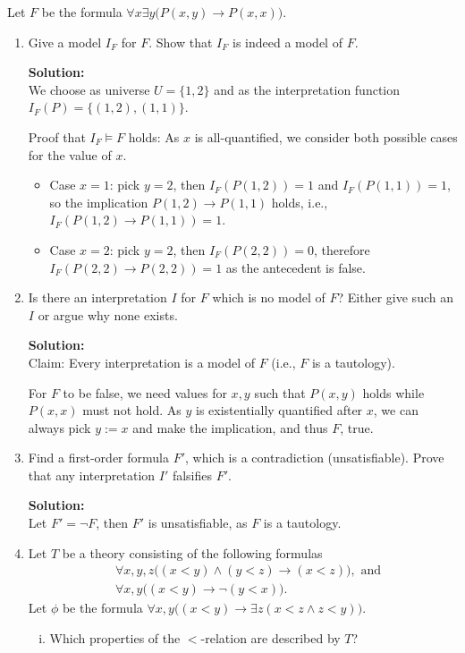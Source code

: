 \documentclass[11pt,a4paper]{uebung}
\newcommand{\solution}[1]{\par {\bf Solution:}\\#1}
\begin{document}
\newpage


Let $F$ be the formula $\forall x \exists y \big( P(x,y) \rightarrow P(x,x) \big)$.

\begin{enumerate}
\item Give a model $I_F$ for $F$. Show that $I_F$ is indeed a model of $F$.
\solution{

  We choose as universe $U = \{ 1,2 \}$ and as the interpretation function
  $I_F(P)=\{ (1,2), (1,1) \}$.

  Proof that $I_F \models F$ holds: 
  As $x$ is all-quantified, we consider both possible cases for the value of
  $x$.
  \begin{itemize}
  \item Case $x=1$: pick $y=2$, then $I_F(P(1,2))=1$ and $I_F(P(1,1))=1$, so
    the implication $P(1,2) \rightarrow P(1,1)$ holds, i.e., $I_F(P(1,2)
    \rightarrow P(1,1))=1$.
  \item Case $x=2$: pick $y=2$, then $I_F(P(2,2))=0$, therefore $I_F(P(2,2)
    \rightarrow P(2,2))=1$ as the antecedent is false.
  \end{itemize}


}

\item Is there an interpretation $I$ for $F$ which is no model of $F$?
  Either give such an $I$ or argue why none exists.

\solution{

  Claim: Every interpretation is a model of $F$ (i.e., $F$ is a tautology).

  For $F$ to be false, we need values for $x,y$ such that $P(x,y)$ holds while
  $P(x,x)$ must not hold.
  As $y$ is existentially quantified after $x$, we can always pick
  $y\mathop{:=}x$ and make the implication, and thus $F$, true.
}

\item Find a first-order formula $F'$, which is a contradiction
  (unsatisfiable). Prove that any interpretation $I'$ falsifies $F'$.
\solution{

  Let $F' = \neg F$, then $F'$ is unsatisfiable, as $F$ is a tautology.


}

\item 
Let $T$ be a theory consisting of the following formulas
\begin{align*}
  &\forall x,y,z \big( (x < y) \land (y < z) \rightarrow (x < z) \big), \text{ and}\\
  &\forall x,y \big( (x < y) \rightarrow \neg (y < x) \big).
\end{align*}
Let $\phi$ be the formula $\forall x,y \big( (x < y) \rightarrow \exists z ( x
< z \land z < y) \big)$.
\begin{enumerate}[(i)]
\item
  Which properties of the $<$-relation are described by $T$?


\end{enumerate}
\end{enumerate}
\end{document}
